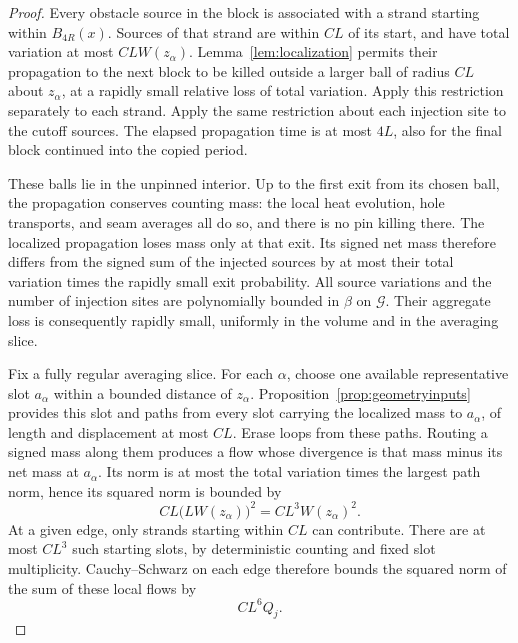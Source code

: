 \begin{proof}
Every obstacle source in the block is associated with a strand starting
within \(B_{4R}(x)\).  Sources of that strand are within \(CL\) of
its start, and have total variation at most \(CLW(z_\alpha)\).
Lemma~\ref{lem:localization} permits their propagation to the next
block to be killed outside a larger ball of radius \(CL\) about
\(z_\alpha\), at a rapidly small relative loss of total variation.
Apply this restriction separately to each strand.  Apply the same
restriction about each injection site to the cutoff sources.  The
elapsed propagation time is at most \(4L\), also for the final block
continued into the copied period.

These balls lie in the unpinned interior.  Up to the first exit from
its chosen ball, the propagation conserves counting mass: the local
heat evolution, hole transports, and seam averages all do so, and
there is no pin killing there.  The localized propagation loses mass
only at that exit.  Its signed net mass therefore differs from the
signed sum of the injected sources by at most their total variation
times the rapidly small exit probability.  All source variations and the number of
injection sites are polynomially bounded in \(\beta\) on
\(\mathcal G\).  Their aggregate loss is consequently rapidly small,
uniformly in the volume and in the averaging slice.

Fix a fully regular averaging slice.  For each \(\alpha\), choose
one available representative slot \(a_\alpha\) within a bounded
distance of \(z_\alpha\).  Proposition~\ref{prop:geometryinputs}
provides this slot and paths from every slot carrying the localized
mass to \(a_\alpha\), of length and displacement at most \(CL\).
Erase loops from these paths.  Routing a signed mass along them
produces a flow whose divergence is that mass minus its net mass at
\(a_\alpha\).  Its norm is at most the total variation times the
largest path norm, hence its squared norm is bounded by
\[
 CL\bigl(LW(z_\alpha)\bigr)^2=CL^3W(z_\alpha)^2.
\]
At a given edge, only strands starting within \(CL\) can contribute.
There are at most \(CL^3\) such starting slots, by deterministic
counting and fixed slot multiplicity.  Cauchy--Schwarz on each edge
therefore bounds the squared norm of the sum of these local flows by
\begin{equation}\label{eq:blocklocalflow}
 CL^6Q_j.
\end{equation}


\end{proof}
